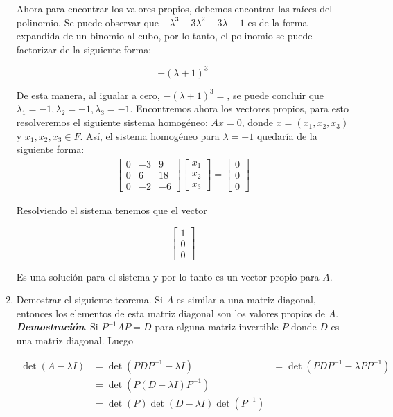 \documentclass{report}
\begin{document}
\begin{enumerate}
        Ahora para encontrar los valores propios, debemos encontrar las raíces del polinomio. Se puede observar que $-\lambda^3 -3\lambda^2 -3\lambda -1$ es de la forma expandida de un binomio al cubo, por lo tanto, el polinomio se puede factorizar de la siguiente forma:

        $$-(\lambda + 1)^3$$

        De esta manera, al igualar a cero, $-(\lambda + 1)^3 = $, se puede concluir que $\lambda_1 = -1, \lambda_2 = -1, \lambda_3 = -1$. Encontremos ahora los vectores propios, para esto resolveremos el siguiente sistema homogéneo: $Ax = 0$, donde $x = (x_1, x_2, x_3)$ y $x_1, x_2, x_3 \in F$. Así, el sistema homogéneo para $\lambda = -1$ quedaría de la siguiente forma:
        \begin{align*}
            \begin{bmatrix}
                0 & -3 & 9\\
                0 & 6 & 18\\
                0 & -2 & -6
            \end{bmatrix}
            \begin{bmatrix}
                x_1\\ x_2\\ x_3
            \end{bmatrix} = \begin{bmatrix}
                0\\0\\0
            \end{bmatrix}
        \end{align*}

        Resolviendo el sistema tenemos que el vector

        $$\begin{bmatrix}
            1\\0\\0
        \end{bmatrix}$$

        Es una solución para el sistema y por lo tanto es un vector propio para $A$.

        \item Demostrar el siguiente teorema. Si $A$ es similar a una matriz diagonal, entonces los elementos de esta matriz diagonal son los valores propios de $A$.
        \textit{\textbf{Demostración}}. Si $P^{-1}AP=D$ para alguna matriz invertible $P$ donde $D$ es una matriz diagonal. Luego

        \begin{align*}
            \det(A - \lambda I) &= \det(PDP^{-1} - \lambda I)\
            &= \det(PDP^{-1}-\lambda PP^{-1})\\
            &= \det(P(D-\lambda I)P^{-1})\\
            &= \det(P) \det(D-\lambda I) \det(P^{-1})
        \end{align*}


\end{enumerate}
\end{document}
